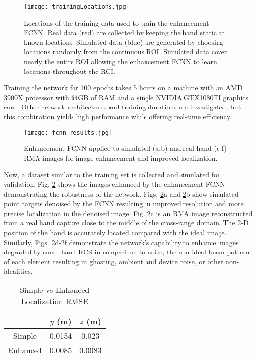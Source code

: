 \documentclass[10pt,journal,final]{IEEEtran}
\begin{document}
\begin{figure}[h]
	\centering
	\texttt{[image: trainingLocations.jpg]}
	\caption{Locations of the training data used to train the enhancement FCNN. Real data (red) are collected by keeping the hand static at known locations. Simulated data (blue) are generated by choosing locations randomly from the continuous ROI. Simulated data cover nearly the entire ROI allowing the enhancement FCNN to learn locations throughout the ROI.}
	\label{fig:fcnn_training_locations}
\end{figure}

Training the network for 100 epochs takes 5 hours on a machine with an AMD 3900X processor with 64GB of RAM and a single NVIDIA GTX1080TI graphics card. Other network architectures and training durations are investigated, but this combination yields high performance while offering real-time efficiency.

\begin{figure}[h]
	\centering
	\texttt{[image: fcnn\_results.jpg]}
	\caption{Enhancement FCNN applied to simulated (a,b) and real hand (c-f) RMA images for image enhancement and improved localization.}
	\label{fig:fcnn_enhancement_demo}
\end{figure}

Now, a dataset similar to the training set is collected and simulated for validation. Fig. \ref{fig:fcnn_enhancement_demo} shows the images enhanced by the enhancement FCNN demonstrating the robustness of the network. Figs. \ref{fig:fcnn_enhancement_demo}a and \ref{fig:fcnn_enhancement_demo}b show simulated point targets denoised by the FCNN resulting in improved resolution and more precise localization in the denoised image. Fig. \ref{fig:fcnn_enhancement_demo}c is an RMA image reconstructed from a real hand capture close to the middle of the cross-range domain. The 2-D position of the hand is accurately located compared with the ideal image. Similarly, Figs. \ref{fig:fcnn_enhancement_demo}d-\ref{fig:fcnn_enhancement_demo}f demonstrate the network's capability to enhance images degraded by small hand RCS in comparison to noise, the non-ideal beam pattern of each element resulting in ghosting, ambient and device noise, or other non-idealities.

\begin{table} [h]
	\caption{Simple vs Enhanced Localization RMSE}
	\centering
	\begin{tabular}{c || c c}
		\hline
		& $y$ (m) & $z$ (m) \\
		\hline\hline
		Simple & 0.0154 & 0.023 \\ 
		\hline
		Enhanced & 0.0085 & 0.0083 \\ 
		\hline
	\end{tabular}
	\label{table:fcnn_position_rmse}
\end{table}
\end{document}
